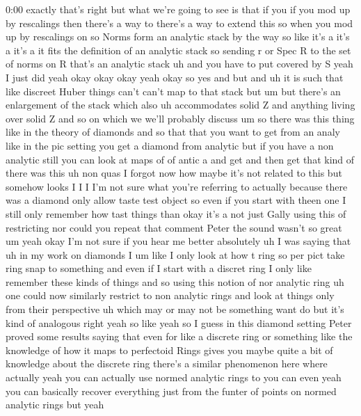 \begin{unfinished}{0:00}
exactly  that's  right  but  what  we're
going  to  see  is  that  if  you  if  you  mod
up  by  rescalings  then  there's  a  way  to
there's  a  way  to  extend  this  so  when  you
mod  up  by  rescalings  on  so  Norms  form  an
analytic  stack  by  the  way
so  like  it's  a  it's  a  it's  a  it  fits  the
definition  of  an  analytic  stack  so
sending  r  or  Spec  R  to  the  set  of  norms
on  R  that's  an  analytic  stack  uh  and  you
have  to  put  covered  by  S  yeah  I  just  did
yeah  okay  okay  okay
yeah  okay  so
yes
and  but  and  uh  it  is  such  that  like
discreet  Huber  things  can't  can't  map  to
that  stack  but
um  but  there's  an  enlargement  of  the
stack  which  also  uh  accommodates  solid  Z
and  anything  living  over  solid  Z  and  so
on  which  we  we'll  probably  discuss  um  so
there  was  this  thing  like  in  the  theory
of  diamonds  and  so  that
that  you  want
to  get  from  an  analy  like  in  the  pic
setting  you  get  a  diamond  from
analytic  but  if  you  have  a  non  analytic
still  you  can  look  at  maps  of  of
antic  a  and  get  and  then  get  that  kind
of  there  was  this
uh  non  quas  I  forgot  now  how  maybe  it's
not  related  to  this  but  somehow  looks  I
I  I  I'm  not  sure  what  you're  referring
to  actually  because  there  was
a  diamond  only  allow  taste  test  object
so  even  if  you  start  with  theen  one  I
still  only  remember  how  tast
things  than  okay  it's
a
not  just  Gally  using  this  of  restricting
nor  could  you  repeat  that  comment  Peter
the  sound  wasn't  so
great
um  yeah  okay  I'm  not  sure  if  you  hear  me
better
absolutely  uh  I  was  saying  that  uh  in  my
work  on  diamonds
I  um  like  I  only  look  at  how  t  ring  so
per  pict  take  ring  snap  to
something  and  even  if  I  start  with  a
discret  ring  I  only  like  remember  these
kinds
of  things  and
so  using  this  notion  of  nor  analytic
ring  uh  one  could  now  similarly  restrict
to  non  analytic  rings  and  look  at  things
only  from  their  perspective  uh  which  may
or  may  not  be  something  want
do  but
it's  kind  of  analogous
right  yeah  so  like  yeah  so  I  guess  in
this  diamond  setting  Peter  proved  some
results  saying  that  even  for  like  a
discrete  ring  or  something  like  the
knowledge  of  how  it  maps  to  perfectoid
Rings  gives  you  maybe  quite  a  bit  of
knowledge  about  the  discrete  ring
there's  a  similar  phenomenon  here  where
actually  yeah  you  can  actually  use
normed  analytic  rings  to  you  can  even
yeah  you  can  basically  recover
everything  just  from  the  funter  of
points  on  normed  analytic  rings  but
yeah
\end{unfinished}